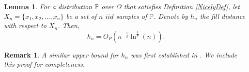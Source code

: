 \documentclass{article}
\newtheorem{lemma}{Lemma}
\newtheorem{remark}{Remark}
\begin{document}
\begin{lemma}
For a distribution $\mathbb{P}$ over $\Omega$ that satisfies Definition \ref{NicelyDef}, let $X_n=\{x_1,x_2,...,x_n\}$ be a set of $n$ $iid$ samples of $\mathbb{P}$. Denote by $h_n$ the fill distance with respect to $X_n$. Then, 
         \begin{equation}
            h_n = O_P(n^{-\frac{1}{d}} \ln ^{\frac{1}{d}}(n)).
         \end{equation}
    \label{Order in probability of h_n}
\end{lemma} 

\begin{remark}
    A similar upper bound for $h_n$ was first established in \cite{reznikov2016covering}. We include this proof for completeness.
\end{remark}
\end{document}
